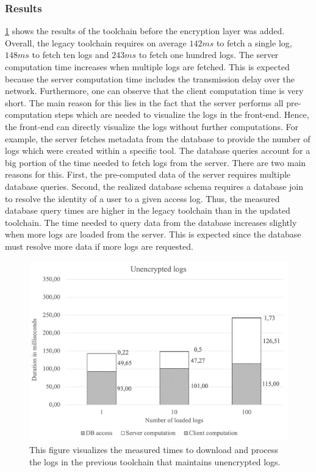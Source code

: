 \documentclass[../main.tex]{subfiles}
\begin{document}
\subsubsection{Results}
\cref{fig:perf-unencrypted} shows the results of the toolchain before the encryption layer was added.
Overall, the legacy toolchain requires on average $142ms$ to fetch a single log, $148ms$ to fetch ten logs and $243ms$ to fetch one hundred logs.
The server computation time increases when multiple logs are fetched.
This is expected because the server computation time includes the transmission delay over the network.
Furthermore, one can observe that the client computation time is very short.
The main reason for this lies in the fact that the server performs all pre-computation steps which are needed to visualize the logs in the front-end.
Hence, the front-end can directly visualize the logs without further computations.
For example, the server fetches metadata from the database to provide the number of logs which were created within a specific tool.
The database queries account for a big portion of the time needed to fetch logs from the server.
There are two main reasons for this.
First, the pre-computed data of the server requires multiple database queries.
Second, the realized database schema requires a database join to resolve the identity of a user to a given access log.
Thus, the measured database query times are higher in the legacy toolchain than in the updated toolchain.
The time needed to query data from the database increases slightly when more logs are loaded from the server.
This is expected since the database must resolve more data if more logs are requested.

\begin{figure}[ht]
    \includegraphics[scale=0.62]{../img/07/unencrypted.png}
    \centering
    \caption[Encryption duration]{This figure visualizes the measured times to download and process the logs in the previous toolchain that maintains unencrypted logs.}
    \label{fig:perf-unencrypted}
\end{figure}
\end{document}
